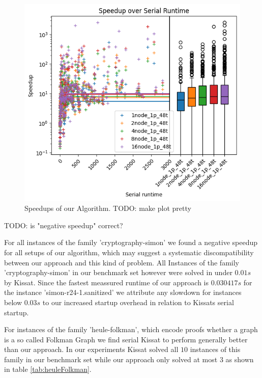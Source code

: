 \documentclass[12pt,a4paper,twoside]{scrartcl}
\numberwithin{equation}{section}
\begin{document}
\begin{figure}
  \center
  \includegraphics{plots/speedups_gim.png}
  \caption{Speedups of our Algorithm. TODO: make plot pretty}
  \label{fig:speedups}
\end{figure}


TODO: is "negative speedup" correct?

For all instances of the family 'cryptography-simon' we found a negative speedup for all setups of our algorithm, which may suggest a systematic discompatibility between our approach and this kind of problem. All Instances of the family 'cryptography-simon' in our benchmark set however were solved in under $0.01s$ by Kissat. Since the fastest meassured runtime of our approach is $0.030417s$ for the instance 'simon-r24-1.sanitized' we attribute any slowdown for instances below $0.03s$ to our increased startup overhead in relation to Kissats serial startup.

For instances of the family 'heule-folkman', which encode proofs whether a graph is a so called Folkman Graph \cite{satCompetition} we find serial Kissat to perform generally better than our approach. In our experiments Kissat solved all $10$ instances of this family in our benchmark set while our approach only solved at most $3$ as shown in table \ref{tab:heuleFolkman}.
\end{document}
